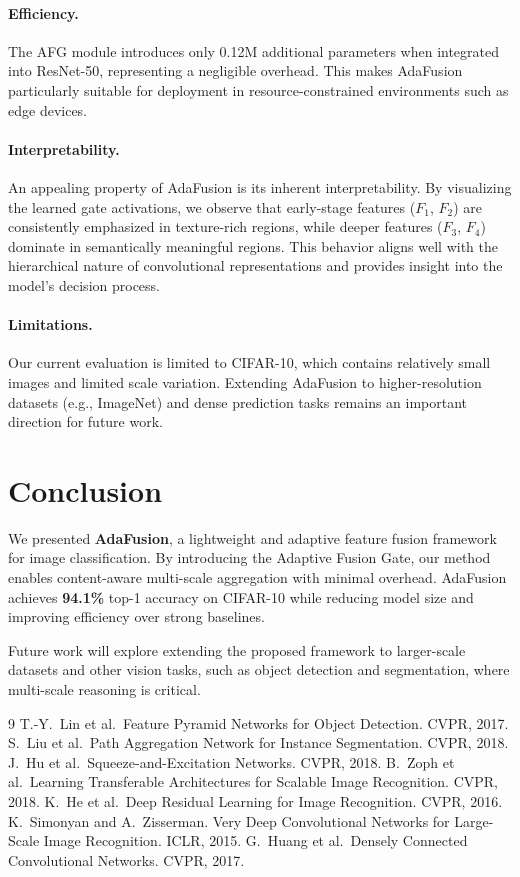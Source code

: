 \documentclass[11pt]{article}
\begin{document}
\paragraph{Efficiency.}
The AFG module introduces only 0.12M additional parameters when integrated into
ResNet-50, representing a negligible overhead. This makes AdaFusion particularly
suitable for deployment in resource-constrained environments such as edge devices.

\paragraph{Interpretability.}
An appealing property of AdaFusion is its inherent interpretability. By visualizing
the learned gate activations, we observe that early-stage features ($F_1$, $F_2$)
are consistently emphasized in texture-rich regions, while deeper features
($F_3$, $F_4$) dominate in semantically meaningful regions. This behavior aligns
well with the hierarchical nature of convolutional representations and provides
insight into the model's decision process.

\paragraph{Limitations.}
Our current evaluation is limited to CIFAR-10, which contains relatively small
images and limited scale variation. Extending AdaFusion to higher-resolution
datasets (e.g., ImageNet) and dense prediction tasks remains an important
direction for future work.

\section{Conclusion}

We presented \textbf{AdaFusion}, a lightweight and adaptive feature fusion
framework for image classification. By introducing the Adaptive Fusion Gate,
our method enables content-aware multi-scale aggregation with minimal overhead.
AdaFusion achieves \textbf{94.1\%} top-1 accuracy on CIFAR-10 while reducing
model size and improving efficiency over strong baselines.

Future work will explore extending the proposed framework to larger-scale
datasets and other vision tasks, such as object detection and segmentation,
where multi-scale reasoning is critical.

\begin{thebibliography}{9}
T.-Y.~Lin et al.\ Feature Pyramid Networks for Object Detection. CVPR, 2017.
S.~Liu et al.\ Path Aggregation Network for Instance Segmentation. CVPR, 2018.
J.~Hu et al.\ Squeeze-and-Excitation Networks. CVPR, 2018.
B.~Zoph et al.\ Learning Transferable Architectures for Scalable Image Recognition. CVPR, 2018.
K.~He et al.\ Deep Residual Learning for Image Recognition. CVPR, 2016.
K.~Simonyan and A.~Zisserman. Very Deep Convolutional Networks for Large-Scale Image Recognition. ICLR, 2015.
G.~Huang et al.\ Densely Connected Convolutional Networks. CVPR, 2017.
\end{thebibliography}
\end{document}
